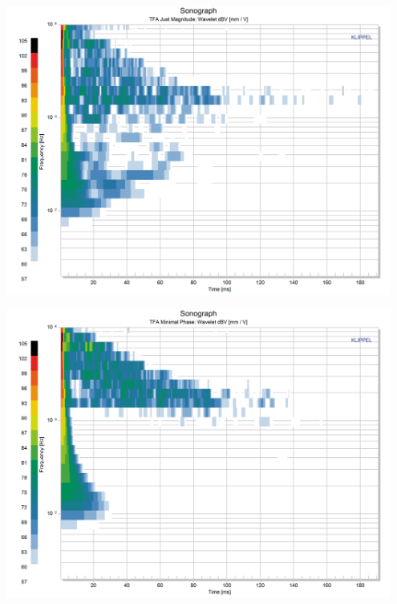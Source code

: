\documentclass{report}
\begin{document}
\begin{minipage}{0.33\textwidth}
\begin{center}
	\includegraphics[width=0.95\textwidth]{RoomComp/Sonograph_MagFilt} 
    \captionsetup{hypcap=false} 
	\label{fig:comp_mag}
\end{center}
\end{minipage}
\begin{minipage}{0.33\textwidth}
\begin{center}
	\includegraphics[width=0.95\textwidth]{RoomComp/Sonograph_MinPhase} 
    \captionsetup{hypcap=false} 
	\label{fig:comp_minphase}
\end{center}
\end{minipage}
\end{document}
